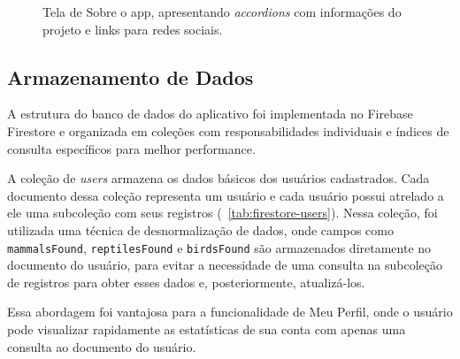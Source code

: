 \begin{figure}[H]
    \caption{Tela de Sobre o app, apresentando \textit{accordions} com informações do projeto e links para redes sociais.}
    \label{fig:sobre-app}
\end{figure}

\subsection{Armazenamento de Dados}
A estrutura do banco de dados do aplicativo foi implementada no Firebase Firestore e organizada 
em coleções com responsabilidades individuais e índices de consulta específicos para melhor performance. 

A coleção de \textit{users} armazena os dados básicos dos usuários cadastrados. 
Cada documento dessa coleção representa um usuário e cada usuário possui atrelado a ele 
uma subcoleção com seus registros (~\ref{tab:firestore-users}).
Nessa coleção, foi utilizada uma técnica de desnormalização de dados, 
onde campos como \texttt{mammalsFound}, \texttt{reptilesFound} e \texttt{birdsFound} 
são armazenados diretamente no documento do usuário, para evitar a necessidade 
de uma consulta na subcoleção de registros para obter esses dados e, posteriormente, 
atualizá-los.

Essa abordagem foi vantajosa para a funcionalidade de Meu Perfil, onde 
o usuário pode visualizar rapidamente as estatísticas de sua conta com apenas 
uma consulta ao documento do usuário.

